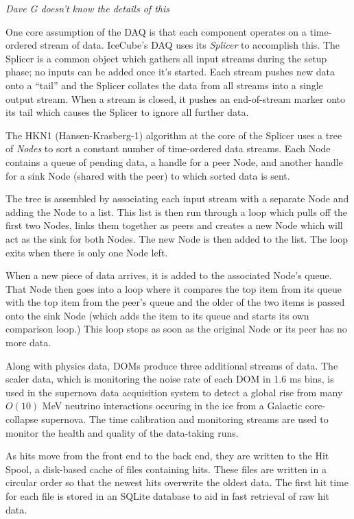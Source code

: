 \textsl{Dave G doesn't know the details of this}

One core assumption of the DAQ is that each component operates on a
time-ordered stream of data.  IceCube's DAQ uses its \emph{Splicer} to
accomplish this.  The Splicer is a common object which gathers all input
streams during the setup phase; no inputs can be added once it's started.  Each
stream pushes new data onto a ``tail'' and the Splicer collates
the data from all streams into a single output stream.  When a
stream is closed, it pushes an end-of-stream marker onto its tail which causes
the Splicer to ignore all further data.

The HKN1 (Hansen-Krasberg-1) algorithm at the core of the Splicer uses a tree
of \emph{Nodes} to sort a constant number of time-ordered data streams.  Each
Node contains a queue of pending data, a handle for a peer Node, and another
handle for a sink Node (shared with the peer) to which sorted data is sent.

The tree is assembled by associating each input stream with a separate Node
and adding the Node to a list.  This list is then run through a loop which
pulls off the first two Nodes, links them together as peers and creates a
new Node which will act as the sink for both Nodes.  The new Node is then added
to the list.  The loop exits when there is only one Node left.

When a new piece of data arrives, it is added to the associated Node's queue.
That Node then goes into a loop where it compares the top item from its queue
with the top item from the peer's queue and the older of the two items is passed
onto the sink Node (which adds the item to its queue and starts its own
comparison loop.)  This loop stops as soon as the original Node or its peer
has no more data.

Along with physics data, DOMs produce three additional streams of data.
The scaler data, which is monitoring the noise rate of each DOM in 1.6 ms bins,
is used in the supernova data acquisition system \cite{sndaq} to detect a
global rise from many $O(10)$ MeV neutrino interactions occuring in the ice
from a Galactic core-collapse supernova.  The time calibration and monitoring
streams are used to monitor the health and quality of the data-taking runs.

As hits move from the front end to the back end, they are written to the
Hit Spool, a disk-based cache of files containing hits.  These files are
written in a circular order so that the newest hits overwrite the oldest data.
The first hit time for each file is stored in an SQLite database to aid in fast
retrieval of raw hit data.

